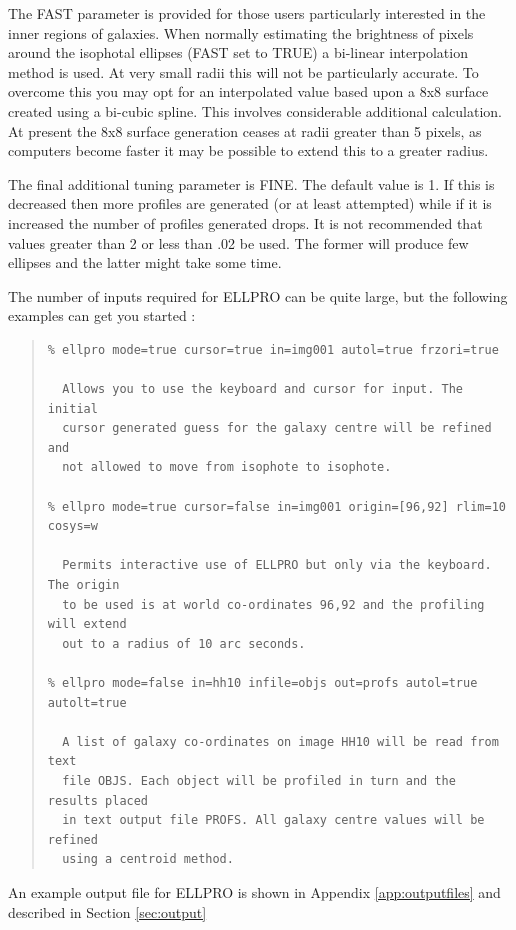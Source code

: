 \documentclass[twoside,11pt]{article}
\newenvironment{myquote}{\begin{quote}\begin{small}}{\end{small}\end{quote}}
\begin{document}
The FAST parameter is provided for those users particularly interested in the 
inner regions of galaxies. When normally estimating the brightness of 
pixels around the isophotal ellipses (FAST set to TRUE) a bi-linear 
interpolation method is used. At very small radii this will not be 
particularly accurate. To overcome this you may opt for an 
interpolated value based upon a 8x8 surface created using a 
bi-cubic spline. This involves considerable additional calculation. 
At present the 8x8 surface generation ceases at radii greater than 
5 pixels, as computers become faster it may be possible to extend this 
to a greater radius.

The final additional tuning parameter is FINE. The default value is 1. 
If this is decreased then more profiles are generated 
(or at least attempted)  while if it is increased the number of 
profiles generated drops. It is not recommended that values greater 
than 2 or less than .02 be used. The former will produce few ellipses 
and the latter might take some time.

The number of inputs required for ELLPRO can be quite large, but the 
following examples can get you started :

\begin{myquote}
\begin{verbatim}
% ellpro mode=true cursor=true in=img001 autol=true frzori=true 

  Allows you to use the keyboard and cursor for input. The initial 
  cursor generated guess for the galaxy centre will be refined and 
  not allowed to move from isophote to isophote.

% ellpro mode=true cursor=false in=img001 origin=[96,92] rlim=10 cosys=w

  Permits interactive use of ELLPRO but only via the keyboard. The origin 
  to be used is at world co-ordinates 96,92 and the profiling will extend 
  out to a radius of 10 arc seconds.

% ellpro mode=false in=hh10 infile=objs out=profs autol=true autolt=true

  A list of galaxy co-ordinates on image HH10 will be read from text 
  file OBJS. Each object will be profiled in turn and the results placed 
  in text output file PROFS. All galaxy centre values will be refined
  using a centroid method.
\end{verbatim}
\end{myquote}

An example output file for ELLPRO is shown in Appendix \ref{app:outputfiles}
and described in Section \ref{sec:output}
\end{document}
